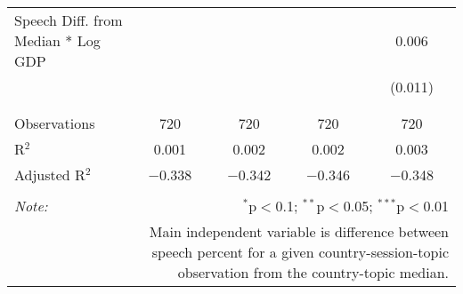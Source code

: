 \begin{table}[!htbp]
\begin{tabular}{@{\extracolsep{5pt}}lcccc}
 Speech Diff. from Median * Log GDP &  &  &  & 0.006 \\ 
  &  &  &  & (0.011) \\ 
  & & & & \\ 
\hline \\[-1.8ex] 
Observations & 720 & 720 & 720 & 720 \\ 
R$^{2}$ & 0.001 & 0.002 & 0.002 & 0.003 \\ 
Adjusted R$^{2}$ & $-$0.338 & $-$0.342 & $-$0.346 & $-$0.348 \\ 
\hline 
\hline \\[-1.8ex] 
\textit{Note:}  & \multicolumn{4}{r}{$^{*}$p$<$0.1; $^{**}$p$<$0.05; $^{***}$p$<$0.01} \\ 
 & \multicolumn{4}{r}{Main independent variable is difference between speech percent for a given country-session-topic observation from the country-topic median.} \\ 
\end{tabular} 
\end{table} 
